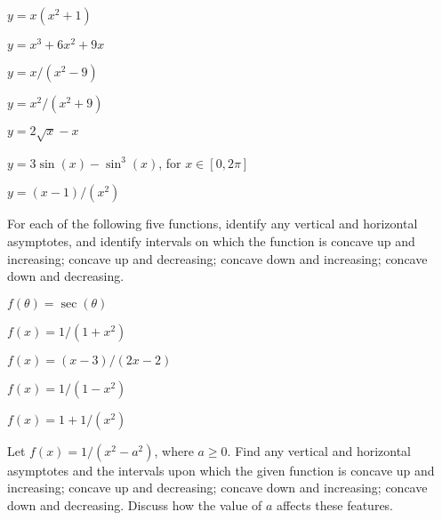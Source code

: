 \begin{exercises}
\begin{exercise} $y=x(x^2+1)$
\end{exercise}

\begin{exercise} $y=x^3+6x^2 + 9x$
\end{exercise}

\begin{exercise} $y=x/(x^2-9)$
\end{exercise}

\begin{exercise} $y=x^2/(x^2+9)$
\end{exercise}

\begin{exercise} $y=2\sqrt{x} - x$
\end{exercise}

\begin{exercise} $y=3\sin(x) - \sin^3(x)$, for $x\in[0,2\pi]$
\end{exercise}

\begin{exercise} $y=(x-1)/(x^2)$
\end{exercise}

\endtwocol

\msk
\noindent
For each of the following five functions, identify any vertical and horizontal
asymptotes, and identify intervals on which the function is 
concave up and increasing; concave up and decreasing; concave
down and increasing; concave down and decreasing.

\begin{exercise} $f(\theta)=\sec(\theta)$ \end{exercise}
\begin{exercise} $f(x) = 1/(1+x^2)$\end{exercise}
\begin{exercise} $f(x) = (x-3)/(2x-2)$ \end{exercise}
\begin{exercise} $f(x) = 1/(1-x^2)$\end{exercise}
\begin{exercise} $f(x) = 1+1/(x^2)$\end{exercise}

\begin{exercise} Let $f(x) = 1/(x^2-a^2)$, where $a\geq0$.  Find any
 vertical and horizontal asymptotes and the intervals upon which the
 given function is concave up and increasing; concave up and
 decreasing; concave down and increasing; concave down and decreasing.
 Discuss how the value of $a$ affects these features.
\end{exercise}



\end{exercises}

